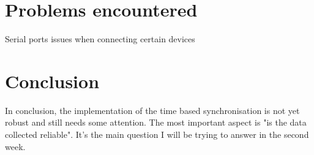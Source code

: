 \documentclass[a4paper, 12pt]{article}
\begin{document}
\section{Problems encountered} 
Serial ports issues when connecting certain devices

\section{Conclusion}
In conclusion, the implementation of the time based synchronisation is not yet robust and still needs some attention.
The most important aspect is "is the data collected reliable". It's the main question I will be trying to answer in the second week.

\printbibliography
\end{document}
